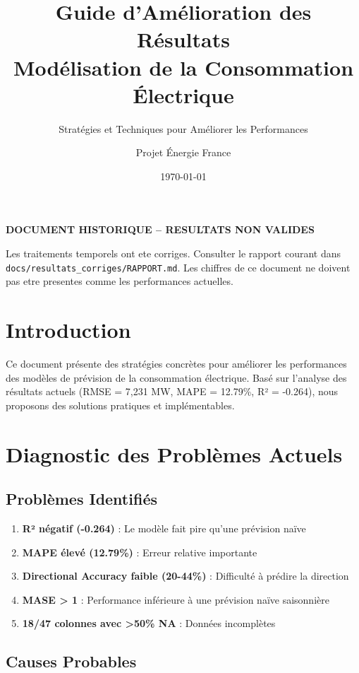 \documentclass[12pt,a4paper]{article}
\title{\textbf{Guide d'Amélioration des Résultats\\Modélisation de la Consommation Électrique}}
\subtitle{Stratégies et Techniques pour Améliorer les Performances}
\author{Projet Énergie France}
\date{\today}
\begin{document}
\begin{center}\textbf{DOCUMENT HISTORIQUE -- RESULTATS NON VALIDES}\end{center}
Les traitements temporels ont ete corriges. Consulter le rapport courant dans \texttt{docs/resultats\_corriges/RAPPORT.md}. Les chiffres de ce document ne doivent pas etre presentes comme les performances actuelles.


\maketitle

\section{Introduction}

Ce document présente des stratégies concrètes pour améliorer les performances des modèles de prévision de la consommation électrique. Basé sur l'analyse des résultats actuels (RMSE = 7,231 MW, MAPE = 12.79\%, R² = -0.264), nous proposons des solutions pratiques et implémentables.

\section{Diagnostic des Problèmes Actuels}

\subsection{Problèmes Identifiés}

\begin{enumerate}
    \item \textbf{R² négatif (-0.264)} : Le modèle fait pire qu'une prévision naïve
    \item \textbf{MAPE élevé (12.79\%)} : Erreur relative importante
    \item \textbf{Directional Accuracy faible (20-44\%)} : Difficulté à prédire la direction
    \item \textbf{MASE > 1} : Performance inférieure à une prévision naïve saisonnière
    \item \textbf{18/47 colonnes avec >50\% NA} : Données incomplètes
\end{enumerate}

\subsection{Causes Probables}
\end{document}
